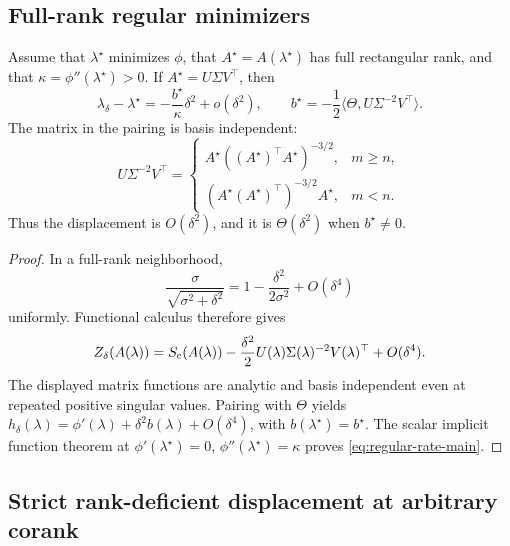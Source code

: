 \subsection{Full-rank regular minimizers}

\begin{theorem}
\label{thm:rate-regular}
Assume that \(\lambda^\star\) minimizes \(\phi\), that
\(A^\star=A(\lambda^\star)\) has full rectangular rank, and that
\(\kappa=\phi''(\lambda^\star)>0\).  If
\(A^\star=U\Sigma V^\top\), then
\begin{equation}
 \lambda_\delta-\lambda^\star
 =-\frac{b^\star}{\kappa}\delta^2+o(\delta^2),
 \qquad
 b^\star=-\frac12
 \langle\Theta,U\Sigma^{-2}V^\top\rangle.
 \label{eq:regular-rate-main}
\end{equation}
The matrix in the pairing is basis independent:
\begin{equation}
 U\Sigma^{-2}V^\top=
 \begin{cases}
 A^\star((A^\star)^\top A^\star)^{-3/2},&m\ge n,\\
 (A^\star(A^\star)^\top)^{-3/2}A^\star,&m<n.
 \end{cases}
 \label{eq:regular-intrinsic-main}
\end{equation}
Thus the displacement is \(O(\delta^2)\), and it is
\(\Theta(\delta^2)\) when \(b^\star\ne0\).
\end{theorem}

\begin{proof}
In a full-rank neighborhood,
\[
 \frac{\sigma}{\sqrt{\sigma^2+\delta^2}}
 =1-\frac{\delta^2}{2\sigma^2}+O(\delta^4)
\]
uniformly.  Functional calculus therefore gives
\[
 Z_\delta(A(\lambda))
 =S_{\mathrm c}(A(\lambda))
 -\frac{\delta^2}{2}
 U(\lambda)\Sigma(\lambda)^{-2}V(\lambda)^\top
 +O(\delta^4).
\]
The displayed matrix functions are analytic and basis independent even at
repeated positive singular values.  Pairing with \(\Theta\) yields
\(h_\delta(\lambda)=\phi'(\lambda)+\delta^2b(\lambda)+O(\delta^4)\), with
\(b(\lambda^\star)=b^\star\).  The scalar implicit function theorem at
\(\phi'(\lambda^\star)=0\), \(\phi''(\lambda^\star)=\kappa\) proves
\eqref{eq:regular-rate-main}.
\end{proof}

\subsection{Strict rank-deficient displacement at arbitrary corank}

